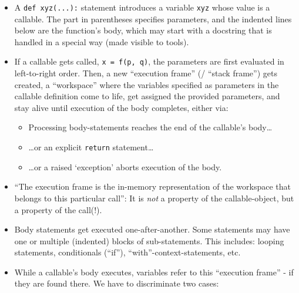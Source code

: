 \documentclass[11pt]{article}
\providecommand{\tightlist}{%
      \setlength{\itemsep}{0pt}\setlength{\parskip}{0pt}}
\begin{document}
\begin{itemize}
\item
  A \texttt{def\ xyz(...):} statement introduces a variable \texttt{xyz}
  whose value is a callable. The part in parentheses specifies
  parameters, and the indented lines below are the function's body,
  which may start with a docstring that is handled in a special way
  (made visible to tools).
\item
  If a callable gets called, \texttt{x\ =\ f(p,\ q)}, the parameters are
  first evaluated in left-to-right order. Then, a new ``execution
  frame'' (/ ``stack frame'') gets created, a ``workspace'' where the
  variables specified as parameters in the callable definition come to
  life, get assigned the provided parameters, and stay alive until
  execution of the body completes, either via:

  \begin{itemize}
  \tightlist
  \item
    Processing body-statements reaches the end of the callable's
    body\ldots{}
  \item
    \ldots or an explicit \texttt{return} statement\ldots{}
  \item
    \ldots or a raised `exception' aborts execution of the body.
  \end{itemize}
\item
  ``The execution frame is the in-memory representation of the workspace
  that belongs to this particular call'': It is \emph{not} a property of
  the callable-object, but a property of the call(!).
\item
  Body statements get executed one-after-another. Some statements may
  have one or multiple (indented) blocks of sub-statements. This
  includes: looping statements, conditionals (``if''),
  ``with''-context-statements, etc.
\item
  While a callable's body executes, variables refer to this ``execution
  frame'' - if they are found there. We have to discriminate two cases:


\end{itemize}
\end{document}
